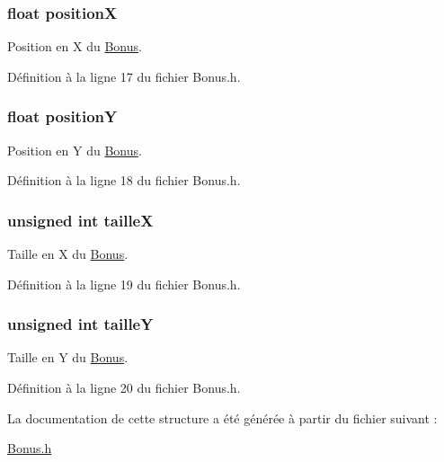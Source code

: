 \hypertarget{struct_bonus_a79a982036e5591bf27af7cc2edcd6f4c}{
\subsubsection[{position\-X}]{\setlength{\rightskip}{0pt plus 5cm}float position\-X}}\label{struct_bonus_a79a982036e5591bf27af7cc2edcd6f4c}
Position en X du \hyperlink{struct_bonus}{Bonus}. 

Définition à la ligne 17 du fichier Bonus.\-h.

\hypertarget{struct_bonus_ad17be35b83017d6dc83074e6b8d21207}{
\subsubsection[{position\-Y}]{\setlength{\rightskip}{0pt plus 5cm}float position\-Y}}\label{struct_bonus_ad17be35b83017d6dc83074e6b8d21207}
Position en Y du \hyperlink{struct_bonus}{Bonus}. 

Définition à la ligne 18 du fichier Bonus.\-h.

\hypertarget{struct_bonus_a14a7f2008ff990cae95babeb28176bad}{
\subsubsection[{taille\-X}]{\setlength{\rightskip}{0pt plus 5cm}unsigned int taille\-X}}\label{struct_bonus_a14a7f2008ff990cae95babeb28176bad}
Taille en X du \hyperlink{struct_bonus}{Bonus}. 

Définition à la ligne 19 du fichier Bonus.\-h.

\hypertarget{struct_bonus_ab277c464cec35f230262c48fec89a566}{
\subsubsection[{taille\-Y}]{\setlength{\rightskip}{0pt plus 5cm}unsigned int taille\-Y}}\label{struct_bonus_ab277c464cec35f230262c48fec89a566}
Taille en Y du \hyperlink{struct_bonus}{Bonus}. 

Définition à la ligne 20 du fichier Bonus.\-h.



La documentation de cette structure a été générée à partir du fichier suivant \-:\begin{DoxyCompactItemize}
\item 
\hyperlink{_bonus_8h}{Bonus.\-h}\end{DoxyCompactItemize}
